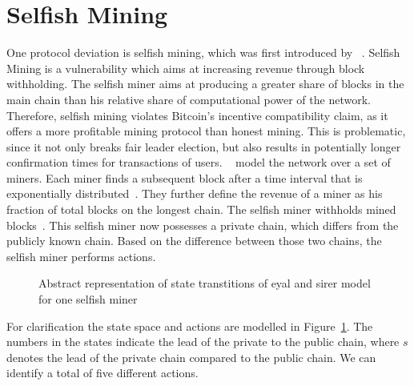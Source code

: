 \section{Selfish Mining}\label{eyalmodel}
One protocol deviation is selfish mining, which was first introduced by \citeauthor{eyal}~\cite{eyal}.
Selfish Mining is a vulnerability which aims at increasing revenue through block withholding. The selfish miner aims at producing a greater share of blocks in the main chain than his relative share of computational power of the network. Therefore, selfish mining violates Bitcoin's incentive compatibility claim, as it offers a more profitable mining protocol than honest mining. This is problematic, since it not only breaks fair leader election, but also results in potentially longer confirmation times for transactions of users.
~\citeauthor{eyal} model the network over a set of miners. Each miner finds a subsequent block after a time interval that is exponentially distributed~\cite{eyal}. They further define the revenue of a miner as his fraction of total blocks on the longest chain.
The selfish miner withholds mined blocks~\cite{eyal}. This selfish miner now possesses a private chain, which differs from the publicly known chain. Based on the difference between those two chains, the selfish miner performs actions. 
\begin{figure}[t]
\begin{center}
\end{center}
   \caption{Abstract representation of state transtitions of eyal and sirer model for one selfish miner}
\label{fig:eyal_model}

\end{figure}
For clarification the state space and actions are modelled in Figure~\ref{fig:eyal_model}. The numbers in the states indicate the lead of the private to the public chain, where $s$ denotes the lead of the private chain compared to the public chain. We can identify a total of five different actions.
